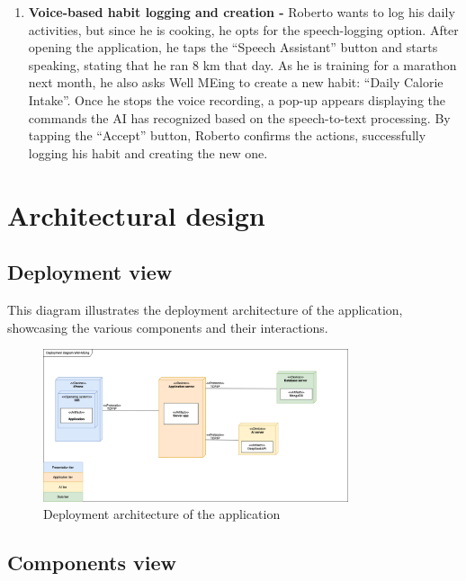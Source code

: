 \documentclass{article}
\begin{document}
\begin{enumerate}[label=\textbf{S\arabic* -}]
    \item \textbf{Voice-based habit logging and creation -}
        Roberto wants to log his daily activities, but since he is cooking, he opts for the speech-logging option.
        After opening the application, he taps the “Speech Assistant” button and starts speaking, stating that he ran 8 km that day.
        As he is training for a marathon next month, he also asks Well MEing to create a new habit: “Daily Calorie Intake”.
        Once he stops the voice recording, a pop-up appears displaying the commands the AI has recognized based on the speech-to-text processing.
        By tapping the “Accept” button, Roberto confirms the actions, successfully logging his habit and creating the new one.

\end{enumerate}

\section{Architectural design}

\subsection{Deployment view}

This diagram illustrates the deployment architecture of the application, showcasing the various components and their interactions.

\begin{figure}
    \centering
    \includegraphics[width=0.8\textwidth]{images/DeploymentView.png}
    \caption{Deployment architecture of the application}
    \label{fig:deployment_diagram}
\end{figure}

\subsection{Components view}
\end{document}
